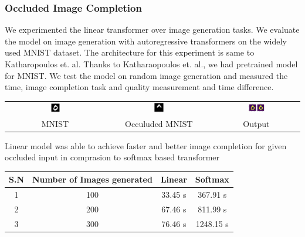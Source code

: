 \documentclass{article}
\newcommand\Tstrut{\rule{0pt}{2.6ex}}
\begin{document}
\subsubsection{Occluded Image Completion}
We experimented the linear transformer over image generation tasks. We evaluate the model on image generation with autoregressive transformers on the widely used MNIST dataset. The architecture for this experiment is same to Katharopoulos et. al. Thanks to Katharaopoulos et. al., we had pretrained model for MNIST. We test the model on random image generation and measured the time, image completion task and quality measurement and time difference. 
\begin{center}
    \begin{tabular}{c c c }
        \includegraphics[width=0.1\textwidth]{images/input0.png} & \includegraphics[width=0.1\textwidth]{images/occuluded0.png} & \includegraphics[width=0.2\textwidth]{images/result0.png} \\
		MNIST & Occuluded MNIST & Output
    \end{tabular}
\end{center}
    {Linear model was able to achieve faster and better image completion for given occluded input in comprasion to softmax based transformer}

\begin{center}
    \begin{tabular}{c|c|c|c}
        S.N & Number of Images generated & Linear & Softmax \\
        \hline
         1 & 100 & 33.45 s & 367.91 s \Tstrut\\
         2 & 200 & 67.46 s & 811.99 s\\
         3 & 300 & 76.46 s & 1248.15 s\\
    
    \end{tabular}
\end{center}
\end{document}
